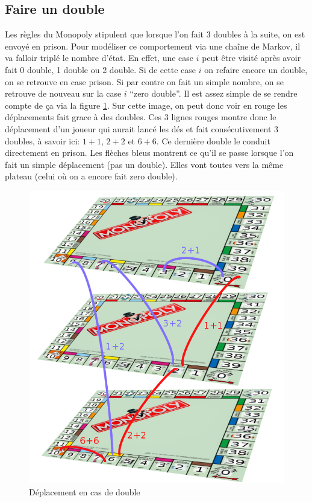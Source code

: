 \documentclass[letterpaper]{article}
\begin{document}
  \subsection{Faire un double}
    Les règles du Monopoly stipulent que lorsque l'on fait 3 doubles à la suite, on est
    envoyé en prison.  Pour modéliser ce comportement via une chaîne de Markov, il va 
    falloir triplé le nombre d'état.  En effet, une case $i$ peut être visité après avoir
    fait 0 double, 1 double ou 2 double.  Si de cette case $i$ on refaire encore un double,
    on se retrouve en case prison.  Si par contre on fait un simple nombre, on se retrouve
    de nouveau sur la case $i$ ``zero double''.  Il est assez simple de se rendre compte de
    ça via la figure \ref{representation_double}.  Sur cette image, on peut donc voir en 
    rouge les déplacements fait grace à des doubles.  Ces 3 lignes rouges montre
    donc le déplacement d'un joueur qui aurait lancé les dés et fait consécutivement 3 doubles,
    à savoir ici: $1+1$, $2+2$ et $6+6$.  Ce dernière double le conduit directement en prison.
    Les flèches bleus montrent ce qu'il se passe lorsque l'on fait un simple déplacement (pas un double).
    Elles vont toutes vers la même plateau (celui où on a encore fait zero double).
    \begin{figure}[h]
      \centering
      \includegraphics[scale=0.4]{./Images/MonopolyVertical.png}
	\caption{Déplacement en cas de double}
	\label{representation_double}
    \end{figure}
\end{document}
